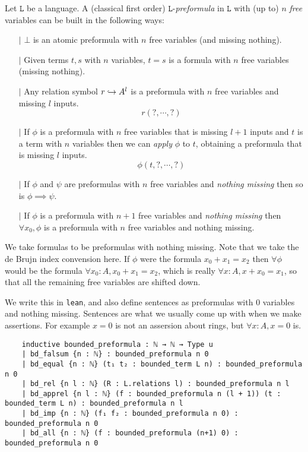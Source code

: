 \begin{dfn}[Formulas]
  Let $\texttt{L}$ be a language.
  A (classical first order) $\texttt{L}$-\textit{preformula} in $\texttt{L}$
  with (up to) $n$ \textit{free} variables can be built in the following ways:
  \begin{itemize}
    \item[$\vert$] $\bot$ is an atomic preformula with $n$ free variables
          (and missing nothing).
    \item[$\vert$]
          Given terms $t, s$ with $n$ variables,
          $t = s$ is a formula with $n$ free variables (missing nothing).
    \item[$\vert$] Any relation symbol $r \hookrightarrow A^{l}$ is a preformula
          with $n$ free variables and missing $l$ inputs.
          \[ r (?, \cdots, ?)\]
    \item[$\vert$] If $\phi$ is a preformula with $n$ free variables that is missing
          $l + 1$ inputs and $t$ is a term with $n$ variables
          then we can \textit{apply} $\phi$ to $t$, obtaining
          a preformula that is missing $l$ inputs.
          \[ \phi(t , ? , \cdots, ? )\]
    \item[$\vert$] If $\phi$ and $\psi$ are preformulas with $n$ free variables
          and \textit{nothing missing} then so is $\phi \implies \psi$.
    \item[$\vert$] If $\phi$ is a preformula with $n + 1$ free variables
          and \textit{nothing missing} then $\forall x_{0}, \phi$ is a preformula
          with $n$ free variables and nothing missing.
  \end{itemize}

  We take formulas to be preformulas with nothing missing.
  Note that we take the de Brujn index convension here.
  If $\phi$ were the formula $x_{0} + x_{1} = x_{2}$ then $\forall \phi$ would be
  the formula $\forall x_{0} : A, x_{0} + x_{1} = x_{2}$,
  which is really $\forall x : A, x + x_{0} = x_{1}$,
  so that all the remaining free variables are shifted down.

  We write this in \texttt{lean},
  and also define sentences as preformulas with $0$ variables and nothing missing.
  Sentences are what we usually come up with when we make assertions.
  For example $x = 0$ is not an assersion about rings,
  but $\forall x : A, x = 0$ is.

  \begin{lstlisting}
    inductive bounded_preformula : ℕ → ℕ → Type u
    | bd_falsum {n : ℕ} : bounded_preformula n 0
    | bd_equal {n : ℕ} (t₁ t₂ : bounded_term L n) : bounded_preformula n 0
    | bd_rel {n l : ℕ} (R : L.relations l) : bounded_preformula n l
    | bd_apprel {n l : ℕ} (f : bounded_preformula n (l + 1)) (t : bounded_term L n) : bounded_preformula n l
    | bd_imp {n : ℕ} (f₁ f₂ : bounded_preformula n 0) : bounded_preformula n 0
    | bd_all {n : ℕ} (f : bounded_preformula (n+1) 0) : bounded_preformula n 0


\end{lstlisting}
\end{dfn}
